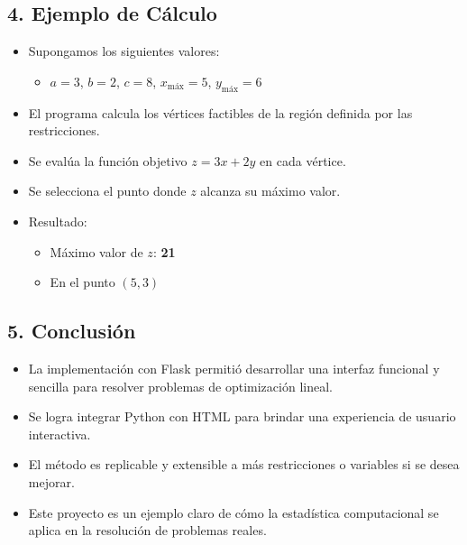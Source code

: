 \documentclass[a4paper,10pt]{article}
\begin{document}
\subsection*{4. Ejemplo de C\'alculo}
\begin{itemize}
  \item Supongamos los siguientes valores:
  \begin{itemize}
    \item $a = 3$, $b = 2$, $c = 8$, $x_{\text{m\'ax}} = 5$, $y_{\text{m\'ax}} = 6$
  \end{itemize}
  \item El programa calcula los v\'ertices factibles de la regi\'on definida por las restricciones.
  \item Se eval\'ua la funci\'on objetivo $z = 3x + 2y$ en cada v\'ertice.
  \item Se selecciona el punto donde $z$ alcanza su m\'aximo valor.
  \item Resultado:
  \begin{itemize}
    \item M\'aximo valor de $z$: \textbf{21}
    \item En el punto $(5, 3)$
  \end{itemize}
\end{itemize}

\subsection*{5. Conclusi\'on}
\begin{itemize}
  \item La implementaci\'on con Flask permiti\'o desarrollar una interfaz funcional y sencilla para resolver problemas de optimizaci\'on lineal.
  \item Se logra integrar Python con HTML para brindar una experiencia de usuario interactiva.
  \item El m\'etodo es replicable y extensible a m\'as restricciones o variables si se desea mejorar.
  \item Este proyecto es un ejemplo claro de c\'omo la estad\'istica computacional se aplica en la resoluci\'on de problemas reales.
\end{itemize}
\end{document}
